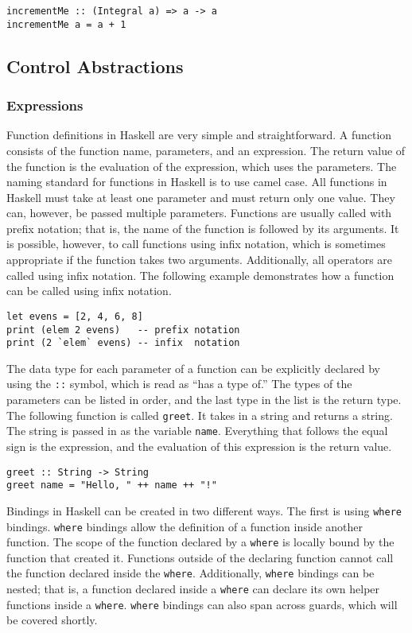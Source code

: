 \documentclass[titlepage,12pt]{article}
\begin{document}
\begin{verbatim}
incrementMe :: (Integral a) => a -> a
incrementMe a = a + 1
\end{verbatim}

\subsection{Control Abstractions}
\subsubsection{Expressions}

Function definitions in Haskell are very simple and straightforward. A function consists of the function name, 
parameters, and an expression. The return value of the function is the evaluation of the expression, which 
uses the parameters. The naming standard for functions in Haskell is to use camel case. All functions in 
Haskell must take at least one parameter and must return only one value. They can, however, be passed 
multiple parameters. Functions are usually called with prefix notation; that is, the name of the function is 
followed by its arguments. It is possible, however, to call functions using infix notation, which is sometimes appropriate 
if the function takes two arguments. Additionally, all operators are called using infix notation. The following example 
demonstrates how a function can be called using infix notation. 

\begin{verbatim}
let evens = [2, 4, 6, 8]
print (elem 2 evens)   -- prefix notation
print (2 `elem` evens) -- infix  notation
\end{verbatim}

The data type for each parameter of a function can be explicitly declared by using the \texttt{::} symbol, which is 
read as ``has a type of.''  The types of the parameters can be listed in order, and the last type in the list 
is the return type. The following function is called \texttt{greet}. It takes in a string and returns a string. The string is passed in as the variable \texttt{name}. Everything that follows the equal sign is the expression, and the evaluation of this expression is the return value. 

\begin{verbatim}
greet :: String -> String
greet name = "Hello, " ++ name ++ "!"
\end{verbatim}

Bindings in Haskell can be created in two different ways. The first is using \texttt{where} bindings. \texttt{where} bindings allow 
the definition of a function inside another function. The scope of the function declared by a \texttt{where} is locally bound 
by the function that created it. Functions outside of the declaring function cannot call the function declared inside 
the \texttt{where}. Additionally, \texttt{where} bindings can be nested; that is, a function declared inside a \texttt{where} can declare
its own helper functions inside a \texttt{where}. \texttt{where} bindings can also span across guards, which will be covered shortly. 
\end{document}
